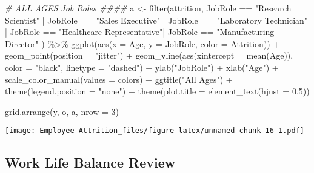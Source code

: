 \documentclass[
]{article}
\newenvironment{Shaded}{\begin{snugshade}}{\end{snugshade}}
\newcommand{\AttributeTok}[1]{\textcolor[rgb]{0.77,0.63,0.00}{#1}}
\newcommand{\CommentTok}[1]{\textcolor[rgb]{0.56,0.35,0.01}{\textit{#1}}}
\newcommand{\DecValTok}[1]{\textcolor[rgb]{0.00,0.00,0.81}{#1}}
\newcommand{\FloatTok}[1]{\textcolor[rgb]{0.00,0.00,0.81}{#1}}
\newcommand{\FunctionTok}[1]{\textcolor[rgb]{0.00,0.00,0.00}{#1}}
\newcommand{\NormalTok}[1]{#1}
\newcommand{\OtherTok}[1]{\textcolor[rgb]{0.56,0.35,0.01}{#1}}
\newcommand{\SpecialCharTok}[1]{\textcolor[rgb]{0.00,0.00,0.00}{#1}}
\newcommand{\StringTok}[1]{\textcolor[rgb]{0.31,0.60,0.02}{#1}}
\begin{document}
\begin{Shaded}
\begin{Highlighting}[]
\CommentTok{\# ALL AGES Job Roles \#\#\#\#}
\NormalTok{a }\OtherTok{\textless{}{-}} \FunctionTok{filter}\NormalTok{(attrition, JobRole }\SpecialCharTok{==} \StringTok{"Research Scientist"} \SpecialCharTok{|}\NormalTok{ JobRole }\SpecialCharTok{==} \StringTok{"Sales Executive"}  \SpecialCharTok{|}\NormalTok{ JobRole }\SpecialCharTok{==} \StringTok{"Laboratory Technician"} \SpecialCharTok{|}\NormalTok{ JobRole }\SpecialCharTok{==} \StringTok{"Healthcare Representative"}\SpecialCharTok{|}\NormalTok{ JobRole }\SpecialCharTok{==} \StringTok{"Manufacturing Director"}\NormalTok{ ) }\SpecialCharTok{\%\textgreater{}\%}
  \FunctionTok{ggplot}\NormalTok{(}\FunctionTok{aes}\NormalTok{(}\AttributeTok{x =}\NormalTok{ Age, }\AttributeTok{y =}\NormalTok{ JobRole, }\AttributeTok{color =}\NormalTok{ Attrition)) }\SpecialCharTok{+}
  \FunctionTok{geom\_point}\NormalTok{(}\AttributeTok{position =} \StringTok{"jitter"}\NormalTok{) }\SpecialCharTok{+}
  \FunctionTok{geom\_vline}\NormalTok{(}\FunctionTok{aes}\NormalTok{(}\AttributeTok{xintercept =} \FunctionTok{mean}\NormalTok{(Age)), }\AttributeTok{color =} \StringTok{"black"}\NormalTok{, }\AttributeTok{linetype =} \StringTok{"dashed"}\NormalTok{) }\SpecialCharTok{+}
  \FunctionTok{ylab}\NormalTok{(}\StringTok{"JobRole"}\NormalTok{) }\SpecialCharTok{+}
  \FunctionTok{xlab}\NormalTok{(}\StringTok{"Age"}\NormalTok{) }\SpecialCharTok{+}
  \FunctionTok{scale\_color\_manual}\NormalTok{(}\AttributeTok{values =}\NormalTok{ colors) }\SpecialCharTok{+}
  \FunctionTok{ggtitle}\NormalTok{(}\StringTok{"All Ages"}\NormalTok{) }\SpecialCharTok{+}
  \FunctionTok{theme}\NormalTok{(}\AttributeTok{legend.position =} \StringTok{"none"}\NormalTok{) }\SpecialCharTok{+}
  \FunctionTok{theme}\NormalTok{(}\AttributeTok{plot.title =} \FunctionTok{element\_text}\NormalTok{(}\AttributeTok{hjust =} \FloatTok{0.5}\NormalTok{)) }

\FunctionTok{grid.arrange}\NormalTok{(y, o, a, }\AttributeTok{nrow =} \DecValTok{3}\NormalTok{)}
\end{Highlighting}
\end{Shaded}

\texttt{[image: Employee-Attrition\_files/figure-latex/unnamed-chunk-16-1.pdf]}

\hypertarget{work-life-balance-review}{%
\subsection{Work Life Balance Review}\label{work-life-balance-review}}
\end{document}
